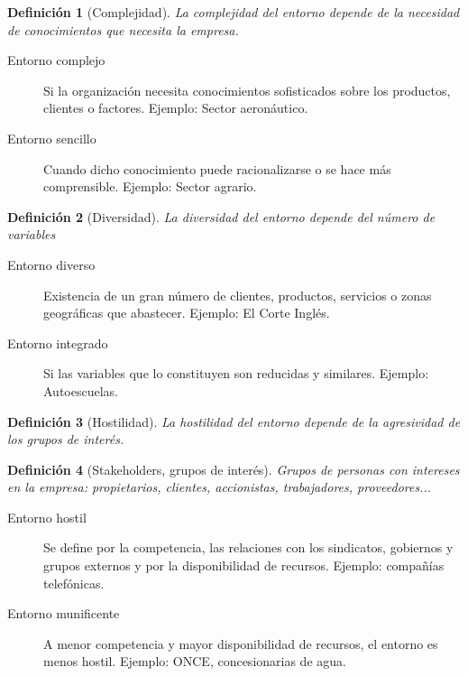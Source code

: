 \documentclass[12pt]{article}
\theoremstyle{definition_wo_parentheses}
\newtheorem{definicion}{Definición}[section]
\begin{document}
\begin{definicion}[Complejidad]
La complejidad del entorno depende de la necesidad de conocimientos que necesita la empresa.
\end{definicion}

\begin{description}
\item[Entorno complejo]Si la organización necesita conocimientos sofisticados sobre los productos, clientes o factores. Ejemplo: Sector aeronáutico.
\item[Entorno sencillo] Cuando dicho conocimiento puede racionalizarse o se hace más comprensible. Ejemplo: Sector agrario.
\end{description}



\begin{definicion}[Diversidad]
La diversidad del entorno depende del número de variables
\end{definicion}

\begin{description}
\item[Entorno diverso] Existencia de un gran número de clientes, productos, servicios o zonas geográficas que abastecer. Ejemplo: El Corte Inglés.
\item[Entorno integrado] Si las variables que lo constituyen son reducidas y similares. Ejemplo: Autoescuelas.
\end{description}



\begin{definicion}[Hostilidad]
La hostilidad del entorno depende de la agresividad de los grupos de interés.
\end{definicion}

\begin{definicion}[Stakeholders, grupos de interés]
Grupos de personas con intereses en la empresa: propietarios, clientes, accionistas, trabajadores, proveedores...
\end{definicion}

\begin{description}
\item[Entorno hostil] Se define por la competencia, las relaciones con los sindicatos, gobiernos y grupos externos y por la disponibilidad de recursos. Ejemplo: compañías telefónicas.
\item[Entorno munificente] A menor competencia y mayor disponibilidad de recursos, el entorno es menos hostil. Ejemplo: ONCE, concesionarias de agua.
\end{description}
\end{document}

